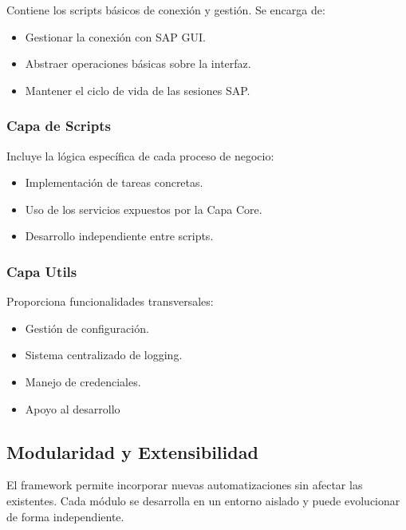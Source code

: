 \documentclass[11pt,a4paper]{article}
\begin{document}
Contiene los scripts básicos de conexión y gestión.  Se encarga de:

\begin{itemize}
    \item Gestionar la conexión con SAP GUI.
    \item Abstraer operaciones básicas sobre la interfaz.
    \item Mantener el ciclo de vida de las sesiones SAP.
\end{itemize}

\subsubsection{Capa de Scripts}

Incluye la lógica específica de cada proceso de negocio:

\begin{itemize}
    \item Implementación de tareas concretas.
    \item Uso de los servicios expuestos por la Capa Core.
    \item Desarrollo independiente entre scripts.
\end{itemize}

\subsubsection{Capa Utils}

Proporciona funcionalidades transversales:

\begin{itemize}
    \item Gestión de configuración.
    \item Sistema centralizado de logging.
    \item Manejo de credenciales.
    \item Apoyo al desarrollo
\end{itemize}

\subsection{Modularidad y Extensibilidad}

El framework permite incorporar nuevas automatizaciones sin afectar las existentes. Cada módulo se desarrolla en un entorno  aislado y puede evolucionar de forma independiente.

\end{document}

